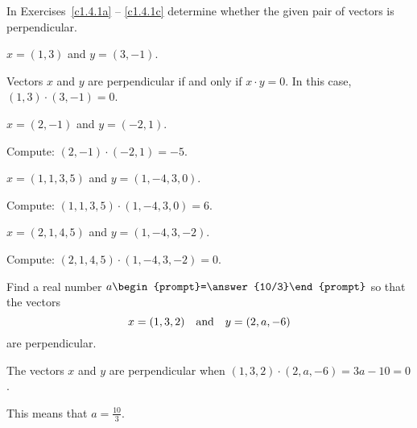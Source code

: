 \documentclass{ximera}
\begin{document}
\noindent In Exercises~\ref{c1.4.1a} -- \ref{c1.4.1c} determine
whether the given pair of vectors is perpendicular.
\begin{exercise} \label{c1.4.1a}
  $x=(1,3)$ and $y=(3,-1)$.
  \begin{multipleChoice}
  \end{multipleChoice}
  \begin{hint}
    Vectors $x$ and $y$ are perpendicular if and only if
    $x \cdot y = 0$.  In this case, $(1,3) \cdot (3,-1) = 0$.
  \end{hint}
\end{exercise}
\begin{exercise} \label{c1.4.1b}
  $x=(2,-1)$ and $y=(-2,1)$.
  \begin{multipleChoice}
  \end{multipleChoice}
  \begin{hint}
    Compute: $(2,-1) \cdot (-2,1) = -5$.
  \end{hint}
\end{exercise}
\begin{exercise} \label{c1.4.1bb}
  $x=(1,1,3,5)$ and $y=(1,-4,3,0)$.
    \begin{multipleChoice}
  \end{multipleChoice}
  \begin{hint}
     Compute: $(1,1,3,5) \cdot (1,-4,3,0) = 6$.
  \end{hint}
\end{exercise}
\begin{exercise} \label{c1.4.1c}
  $x=(2,1,4,5)$ and $y=(1,-4,3,-2)$.
    \begin{multipleChoice}
  \end{multipleChoice}
  \begin{hint}
    Compute: $(2,1,4,5) \cdot (1,-4,3,-2) = 0$.
  \end{hint}
\end{exercise}


\begin{exercise} \label{c1.4.2}
Find a real number $a\begin{prompt}=\answer{10/3}\end{prompt}$ so that the vectors
\[
x = (1,3,2) \quad\mbox{and}\quad y = (2,a,-6)
\]
are perpendicular.
\begin{hint}
  The vectors $x$ and $y$ are perpendicular when
$(1,3,2) \cdot (2,a,-6) = 3a - 10 = 0$.
\end{hint}
\begin{hint}
  This means that $a = \frac{10}{3}$.
\end{hint}
\end{exercise}
\end{document}
